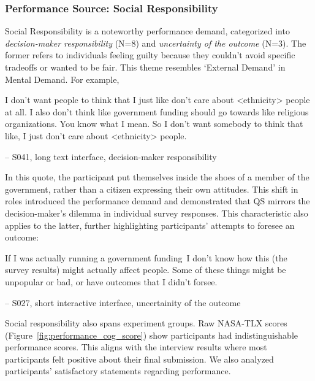 \subsubsection{Performance Source: Social Responsibility}
Social Responsibility is a noteworthy performance demand, categorized into \textit{decision-maker responsibility} (N=8) and \textit{uncertainty of the outcome} (N=3). The former refers to individuals feeling guilty because they couldn’t avoid specific tradeoffs or wanted to be fair. This theme resembles `External Demand' in Mental Demand. For example,

\begin{displayquote}
I don't want people to think that I just like don't care about <ethnicity> people at all. I also don't think like government funding should go towards like religious organizations. You know what I mean. So I don't want somebody to think that like, I just don't care about <ethnicity> people.
    
\noindent \hfill -- S041, long text interface, decision-maker responsibility
\end{displayquote}

In this quote, the participant put themselves inside the shoes of a member of the government, rather than a citizen expressing their own attitudes. This shift in roles introduced the performance demand and demonstrated that QS mirrors the decision-maker's dilemma in individual survey responses. This characteristic also applies to the latter, further highlighting participants' attempts to foresee an outcome:

\begin{displayquote}
If I was actually running a government funding~\bracketellipsis I don't know how this (the survey results) might actually affect people. Some of these things might be unpopular or bad, or have outcomes that I didn't forsee.
    
\noindent \hfill -- S027, short interactive interface, uncertainity of the outcome
\end{displayquote}

Social responsibility also spans experiment groups. Raw NASA-TLX scores (Figure~\ref{fig:performance_cog_score}) show participants had indistinguishable performance scores. This aligns with the interview results where most participants felt positive about their final submission. We also analyzed participants' satisfactory statements regarding performance.

